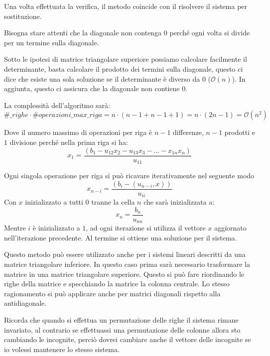 Una volta effettuata la verifica, il metodo coincide con il risolvere il sistema
per sostituzione.
\begin{nota}
    Bisogna stare attenti che la diagonale non contenga $0$ perché ogni volta
    si divide per un termine sulla diagonale.
\end{nota}

Sotto le ipotesi di matrice triangolare superiore possiamo calcolare facilmente
il determinante, basta calcolare il prodotto dei termini sulla diagonale, questo
ci dice che esiste una sola soluzione se il determinante è diverso da $0$
($\mathcal{O}(n)$). In aggiunta, questo ci assicura che la diagonale non contiene $0$.

La complessità dell'algoritmo sarà:
\begin{equation*}
    \#\_righe \cdot \#operazioni\_max\_riga = n \cdot (n - 1 + n - 1 + 1) = n
    \cdot (2n - 1) = \mathcal{O}(n^2)
\end{equation*}
\begin{nota}
    Dove il numero massimo di operazioni per riga è $n - 1$ differenze, $n - 1$
    prodotti e $1$ divisione perché nella prima riga si ha:
    \begin{equation*}
        x_1 = \frac{(b_1 - u_{12} x_2 - u_{13}x_3 - \dots - x_{1n} x_n)}{u_{11}}
    \end{equation*}
\end{nota}
Ogni singola operazione per riga si può ricavare iterativamente nel seguente modo
\begin{equation*}
    x_{n-i} = \frac{(b_i-(u_{n-i},x))}{u_{ii}}
\end{equation*}
Con $x$ inizializzato a tutti $0$ tranne la cella $n$ che sarà inizializzata a:
\begin{equation*}
    x_n = \frac{b_n}{u_{nn}}
\end{equation*}
Mentre $i$ è inizializzato a $1$, ad ogni iterazione si utilizza il vettore $x$
aggiornato nell'iterazione precedente. Al termine si ottiene una soluzione per il
sistema.
\begin{nota}
    Questo metodo può essere utilizzato anche per i sistemi lineari descritti da
    una matrice triangolare inferiore. In questo caso prima sarà necessario
    trasformare la matrice in una matrice triangolare superiore. Questo si può
    fare riordinando le righe della matrice e specchiando la matrice la colonna
    centrale. Lo stesso ragionamento si può applicare anche per matrici diagonali
    rispetto alla antidiagonale.
\end{nota}
\begin{nota}
    Ricorda che quando si effettua un permutazione delle righe il sistema rimane
    invariato, al contrario se effettuassi una permutazione delle colonne allora
    sto cambiando le incognite, perciò dovrei cambiare anche il vettore delle
    incognite se io volessi mantenere lo stesso sistema.
\end{nota}
